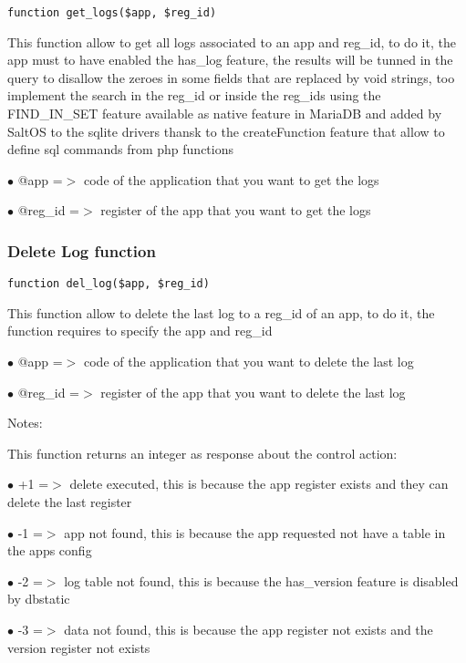 \documentclass[a4paper]{article}
\begin{document}
\begin{lstlisting}
function get_logs($app, $reg_id)
\end{lstlisting}

This function allow to get all logs associated to an app and reg\_id, to do it,
the app must to have enabled the has\_log feature, the results will be tunned
in the query to disallow the zeroes in some fields that are replaced by void
strings, too implement the search in the reg\_id or inside the reg\_ids using
the FIND\_IN\_SET feature available as native feature in MariaDB and added by
SaltOS to the sqlite drivers thansk to the createFunction feature that allow
to define sql commands from php functions

\begin{compactitem}
\item[\color{myblue}$\bullet$] @app    =$>$ code of the application that you want to get the logs
\item[\color{myblue}$\bullet$] @reg\_id =$>$ register of the app that you want to get the logs
\end{compactitem}

\hypertarget{toc492}{}
\subsubsection{Delete Log function}

\begin{lstlisting}
function del_log($app, $reg_id)
\end{lstlisting}

This function allow to delete the last log to a reg\_id of an app, to do it,
the function requires to specify the app and reg\_id

\begin{compactitem}
\item[\color{myblue}$\bullet$] @app    =$>$ code of the application that you want to delete the last log
\item[\color{myblue}$\bullet$] @reg\_id =$>$ register of the app that you want to delete the last log
\end{compactitem}

Notes:

This function returns an integer as response about the control action:

\begin{compactitem}
\item[\color{myblue}$\bullet$] +1 =$>$ delete executed, this is because the app register exists and they can delete the last register
\item[\color{myblue}$\bullet$] -1 =$>$ app not found, this is because the app requested not have a table in the apps config
\item[\color{myblue}$\bullet$] -2 =$>$ log table not found, this is because the has\_version feature is disabled by dbstatic
\item[\color{myblue}$\bullet$] -3 =$>$ data not found, this is because the app register not exists and the version register not exists
\end{compactitem}
\end{document}
